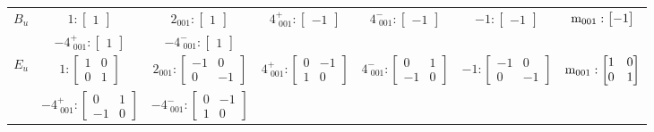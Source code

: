 \documentclass[fleqn,8pt,landscape]{jsarticle}
\begin{document}
\begin{longtable}{ccccccc}
$ B_{u} $ & $ 1:\begin{bmatrix} 1 \end{bmatrix} $ & $ 2{}_{001}:\begin{bmatrix} 1 \end{bmatrix} $ & $ 4^{+}_{\,\,001}:\begin{bmatrix} -1 \end{bmatrix} $ & $ 4^{-}_{\,\,001}:\begin{bmatrix} -1 \end{bmatrix} $ & $ -1:\begin{bmatrix} -1 \end{bmatrix} $ & $ {\rm m}_{001}:\begin{bmatrix} -1 \end{bmatrix} $ \\
& $ -4^{+}_{\,\,001}:\begin{bmatrix} 1 \end{bmatrix} $ & $ -4^{-}_{\,\,001}:\begin{bmatrix} 1 \end{bmatrix} $ & $  $ & $  $ & $  $ & $  $ \\ \hline
$ E_{u} $ & $ 1:\begin{bmatrix} 1 & 0 \\ 0 & 1 \end{bmatrix} $ & $ 2{}_{001}:\begin{bmatrix} -1 & 0 \\ 0 & -1 \end{bmatrix} $ & $ 4^{+}_{\,\,001}:\begin{bmatrix} 0 & -1 \\ 1 & 0 \end{bmatrix} $ & $ 4^{-}_{\,\,001}:\begin{bmatrix} 0 & 1 \\ -1 & 0 \end{bmatrix} $ & $ -1:\begin{bmatrix} -1 & 0 \\ 0 & -1 \end{bmatrix} $ & $ {\rm m}_{001}:\begin{bmatrix} 1 & 0 \\ 0 & 1 \end{bmatrix} $ \\
& $ -4^{+}_{\,\,001}:\begin{bmatrix} 0 & 1 \\ -1 & 0 \end{bmatrix} $ & $ -4^{-}_{\,\,001}:\begin{bmatrix} 0 & -1 \\ 1 & 0 \end{bmatrix} $ & $  $ & $  $ & $  $ & $  $ \\
\end{longtable}
\end{document}

